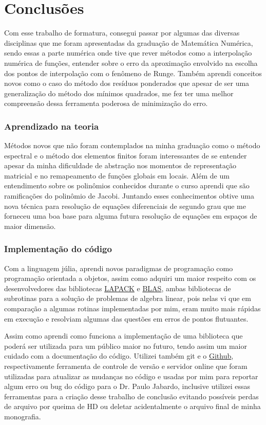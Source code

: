 \chapter{Conclusões}

 Com esse trabalho de formatura, consegui  passar por algumas das diversas disciplinas que me foram apresentadas da graduação de Matemática Numérica, sendo essas a parte numérica onde tive que rever métodos como a interpolação numérica de funções, entender sobre o erro da aproximação envolvido na escolha dos pontos de interpolação com o fenômeno de Runge. Também aprendi conceitos novos como o caso do método dos resíduos ponderados que apesar de ser uma generalização do método dos mínimos quadrados, me fez ter uma melhor compreensão dessa ferramenta poderosa de minimização do erro. 
 \subsection{Aprendizado na teoria}
 Métodos novos que não foram contemplados na minha graduação como o método espectral e o método dos elementos finitos foram interessantes de se entender apesar da minha dificuldade de abstração nos momentos de representação matricial e no remapeamento de funções globais em locais. Além de um entendimento sobre os polinômios conhecidos durante o curso aprendi que são ramificações do polinômio de Jacobi. Juntando esses conhecimentos obtive uma nova técnica para resolução de equações diferenciais de segundo grau que me forneceu uma boa base para alguma futura resolução de equações em espaços de maior dimensão.

 \subsection{Implementação do código} 
 Com a linguagem júlia, aprendi novos paradigmas de programação como programação orientada a objetos, assim como adquiri um maior respeito com os desenvolvedores das bibliotecas \href{http://www.netlib.org/lapack/}{LAPACK} e \href{http://www.netlib.org/blas/}{BLAS}, ambas bibliotecas de subrotinas para a solução de problemas de algebra linear, pois nelas vi que em comparação a algumas rotinas implementadas por mim, eram muito mais rápidas em execução e resolviam algumas das questões em erros de pontos flutuantes. 
 
 Assim como aprendi como funciona a implementação de uma biblioteca que poderá ser utilizada para um público maior no futuro, tendo assim um maior cuidado com a documentação do código. Utilizei também  git e o \href{http://www.github.com/}{Github}, respectivamente ferramenta de controle de versão e servidor online que foram utilizadas para atualizar as mudanças no código e usadas por mim para reportar algum erro ou bug do código para o Dr. Paulo Jabardo, inclusive utilizei essas ferramentas para a criação desse trabalho de conclusão evitando possíveis perdas de arquivo por queima de HD ou deletar acidentalmente o arquivo final de minha monografia.

